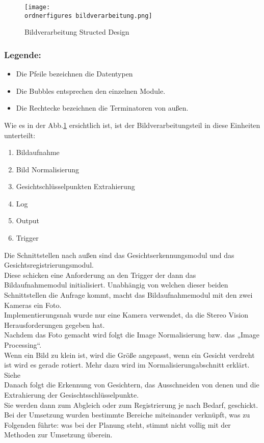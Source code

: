 \begin{figure}
	\centering
	\texttt{[image: \\ordnerfigures bildverarbeitung.png]}
	\caption{ Bildverarbeitung Structed Design}
	\label{fig:bildverarbeitung}
\end{figure}
\subsubsection{Legende:}
\begin{itemize}
	\item Die Pfeile bezeichnen die Datentypen
	\item Die Bubbles entsprechen den einzelnen Module.
	\item Die Rechtecke bezeichnen die Terminatoren von außen.  
\end{itemize}
Wie es in der Abb.\ref{fig:bildverarbeitung} ersichtlich ist, ist der
Bildverarbeitungsteil in diese Einheiten unterteilt:
\begin{enumerate}
	\item Bildaufnahme
	\item Bild Normalisierung
	\item Gesichtschlüsselpunkten Extrahierung
	\item Log
	\item Output 
	\item Trigger 
\end{enumerate}

\begin{flushleft}
	Die Schnittstellen nach außen sind das Gesichtserkennungsmodul und das
	Gesichtsregistrierungsmodul. \\ 
	Diese schicken eine Anforderung an den Trigger der dann das Bildaufnahmemodul
	initialisiert. Unabhängig von welchen dieser beiden Schnittstellen die Anfrage
	kommt, macht das Bildaufnahmemodul mit den zwei Kameras ein Foto. 
	\\
	Implementierungsnah wurde nur eine Kamera verwendet, da die Stereo Vision
	Herausforderungen gegeben hat. \\
	Nachdem das Foto gemacht wird folgt die Image Normalisierung bzw. das „Image
	Processing“. \\
	Wenn ein Bild zu klein ist, wird die Größe angepasst, wenn ein Gesicht verdreht
	ist wird es gerade rotiert. Mehr dazu wird im Normalisierungabschnitt erklärt.
	Siehe \\
	Danach folgt die Erkennung von Gesichtern, das Ausschneiden von denen und die
	Extrahierung der Gesischtsschlüsselpunkte.\\ 
	Sie werden dann zum Abgleich oder zum Registrierung je nach Bedarf, geschickt.
	\\	
	Bei der Umsetzung wurden bestimmte Bereiche miteinander verknüpft, was zu
	Folgenden führte: was bei der Planung steht, stimmt nicht vollig mit der
	Methoden zur Umsetzung überein.
\end{flushleft} 

